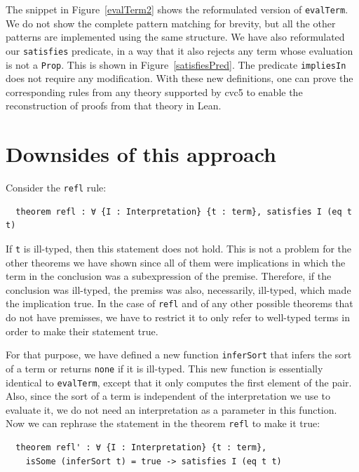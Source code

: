 The snippet in Figure~\ref{evalTerm2} shows the reformulated version of \texttt{evalTerm}.
We do not show the complete pattern matching for brevity, but all the other
patterns are implemented using the same structure.
We have also reformulated our \texttt{satisfies} predicate, in a way that
it also rejects any term whose evaluation is not a \texttt{Prop}. This is shown
in Figure~\ref{satisfiesPred}. The predicate \texttt{impliesIn} does not require
any modification. With these new definitions, one can prove the corresponding
rules from any theory supported by cvc5 to enable the reconstruction of
proofs from that theory in Lean.

\section{Downsides of this approach}\label{sec:downsides}

Consider the \texttt{refl} rule:

\begin{verbatim}
  theorem refl : ∀ {I : Interpretation} {t : term}, satisfies I (eq t t)
\end{verbatim}

If \texttt{t} is ill-typed, then this statement does not hold. This is not
a problem for the other theorems we have shown since all of them were implications in
which the term in the conclusion was a subexpression of the premise. Therefore,
if the conclusion was ill-typed, the premiss was also, necessarily, ill-typed,
which made the implication true. In the case of \texttt{refl} and of
any other possible theorems that do not have premisses, we have to restrict it
to only refer to well-typed terms in order to make their statement true.

For that purpose, we have defined a new function \texttt{inferSort} that infers the sort of a term
or returns \texttt{none} if it is ill-typed.
This new function is essentially identical to
\texttt{evalTerm}, except that it only computes the first element of the pair.
Also, since the sort of a term is independent of the interpretation we use
to evaluate it, we do not need an interpretation as a parameter in this function.
Now we can rephrase the statement in the theorem \texttt{refl} to make it true:

\begin{verbatim}
  theorem refl' : ∀ {I : Interpretation} {t : term},
    isSome (inferSort t) = true -> satisfies I (eq t t)
\end{verbatim}

